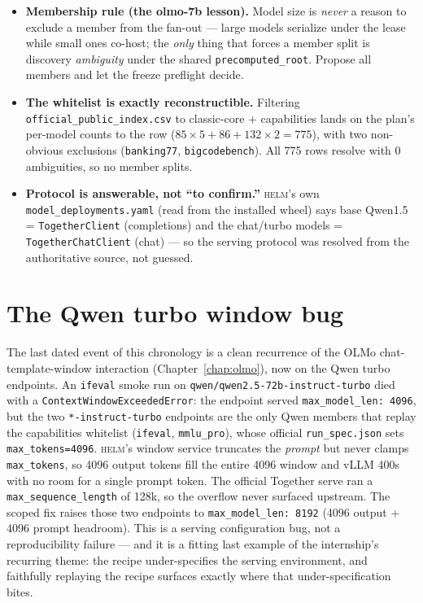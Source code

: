 \documentclass[11pt]{report}
\newcommand{\code}[1]{\texttt{#1}}
\newcommand{\file}[1]{\texttt{#1}}
\begin{document}
\begin{itemize}[nosep]
  \item \textbf{Membership rule (the olmo-7b lesson).} Model size is \emph{never} a
        reason to exclude a member from the fan-out --- large models serialize under
        the lease while small ones co-host; the \emph{only} thing that forces a
        member split is discovery \emph{ambiguity} under the shared
        \code{precomputed\_root}. Propose all members and let the freeze preflight
        decide.
  \item \textbf{The whitelist is exactly reconstructible.} Filtering
        \code{official\_public\_index.csv} to classic-core + capabilities lands on
        the plan's per-model counts to the row ($85\times5 + 86 + 132\times2 = 775$),
        with two non-obvious exclusions (\code{banking77}, \code{bigcodebench}). All
        775 rows resolve with 0 ambiguities, so no member splits.
  \item \textbf{Protocol is answerable, not ``to confirm.''} \textsc{helm}'s own
        \code{model\_deployments.yaml} (read from the installed wheel) says base
        Qwen1.5 = \code{TogetherClient} (completions) and the chat/turbo models =
        \code{TogetherChatClient} (chat) --- so the serving protocol was resolved
        from the authoritative source, not guessed.
\end{itemize}

\section{The Qwen turbo window bug}
\label{sec:qwenwindow}

The last dated event of this chronology is a clean recurrence of the OLMo
chat-template-window interaction (Chapter~\ref{chap:olmo}), now on the Qwen turbo
endpoints. An \code{ifeval} smoke run on
\code{qwen/qwen2.5-72b-instruct-turbo} died with a
\code{ContextWindowExceededError}: the endpoint served \code{max\_model\_len:
4096}, but the two \code{*-instruct-turbo} endpoints are the only Qwen members that
replay the capabilities whitelist (\code{ifeval}, \code{mmlu\_pro}), whose official
\file{run\_spec.json} sets \code{max\_tokens=4096}. \textsc{helm}'s window service
truncates the \emph{prompt} but never clamps \code{max\_tokens}, so 4096 output
tokens fill the entire 4096 window and vLLM 400s with no room for a single prompt
token. The official Together serve ran a \code{max\_sequence\_length} of 128k, so
the overflow never surfaced upstream. The scoped fix raises those two endpoints to
\code{max\_model\_len: 8192} (4096 output + 4096 prompt headroom). This is a serving
configuration bug, not a reproducibility failure --- and it is a fitting last
example of the internship's recurring theme: the recipe under-specifies the
serving environment, and faithfully replaying the recipe surfaces exactly where
that under-specification bites.
\end{document}
